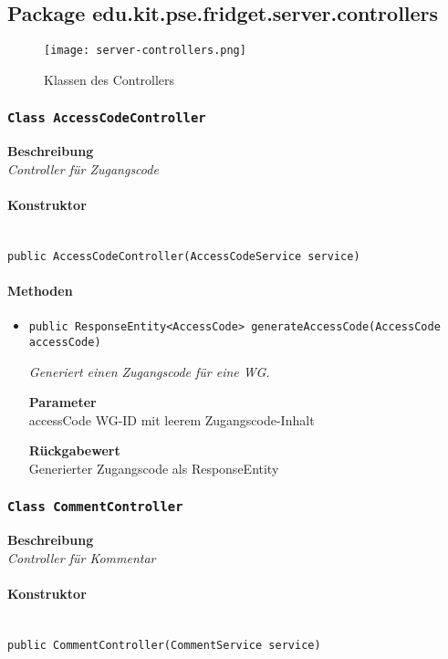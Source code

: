

%
     \subsection{Package edu.kit.pse.fridget.server.controllers}
     \begin{figure}[H]
	       \centering
	       \texttt{[image: server-controllers.png]}
	       \caption{Klassen des Controllers}
	      \end{figure}
     \subsubsection{\texttt{Class AccessCodeController}}
     \textbf{Beschreibung} \\
     \textit{Controller für Zugangscode}
     \paragraph*{Konstruktor}\mbox{} \\
     \texttt{public AccessCodeController(AccessCodeService service)} \\
     \paragraph*{Methoden}
     \begin{itemize}
     	\item{\texttt{public ResponseEntity<AccessCode> generateAccessCode(AccessCode accessCode)}}
     	
     	\textit{Generiert einen Zugangscode für eine WG.}
     	
     	\textbf{Parameter} \\
     	accessCode WG-ID mit leerem Zugangscode-Inhalt
     	
     	\textbf{Rückgabewert} \\
     	Generierter Zugangscode als ResponseEntity
     \end{itemize}
     \subsubsection{\texttt{Class CommentController}}
     \textbf{Beschreibung} \\
     \textit{Controller für Kommentar}
     \paragraph*{Konstruktor}\mbox{} \\
     \texttt{public CommentController(CommentService service)} \\

